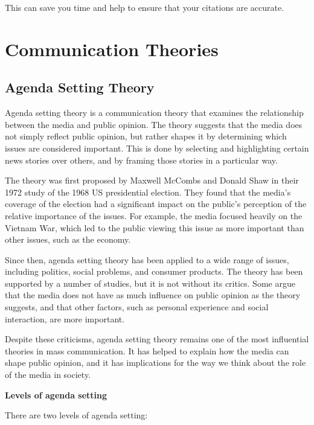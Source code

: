 \documentclass[
  b5paper]{book}
\begin{document}
This can save you time and help to ensure that your citations are accurate.

\hypertarget{communication-theories-1}{%
\chapter{Communication Theories}\label{communication-theories-1}}

\hypertarget{agenda-setting-theory}{%
\section{Agenda Setting Theory}\label{agenda-setting-theory}}

Agenda setting theory is a communication theory that examines the relationship between the media and public opinion. The theory suggests that the media does not simply reflect public opinion, but rather shapes it by determining which issues are considered important. This is done by selecting and highlighting certain news stories over others, and by framing those stories in a particular way.

The theory was first proposed by Maxwell McCombs and Donald Shaw in their 1972 study of the 1968 US presidential election. They found that the media's coverage of the election had a significant impact on the public's perception of the relative importance of the issues. For example, the media focused heavily on the Vietnam War, which led to the public viewing this issue as more important than other issues, such as the economy.

Since then, agenda setting theory has been applied to a wide range of issues, including politics, social problems, and consumer products. The theory has been supported by a number of studies, but it is not without its critics. Some argue that the media does not have as much influence on public opinion as the theory suggests, and that other factors, such as personal experience and social interaction, are more important.

Despite these criticisms, agenda setting theory remains one of the most influential theories in mass communication. It has helped to explain how the media can shape public opinion, and it has implications for the way we think about the role of the media in society.

\textbf{Levels of agenda setting}

There are two levels of agenda setting:
\end{document}
